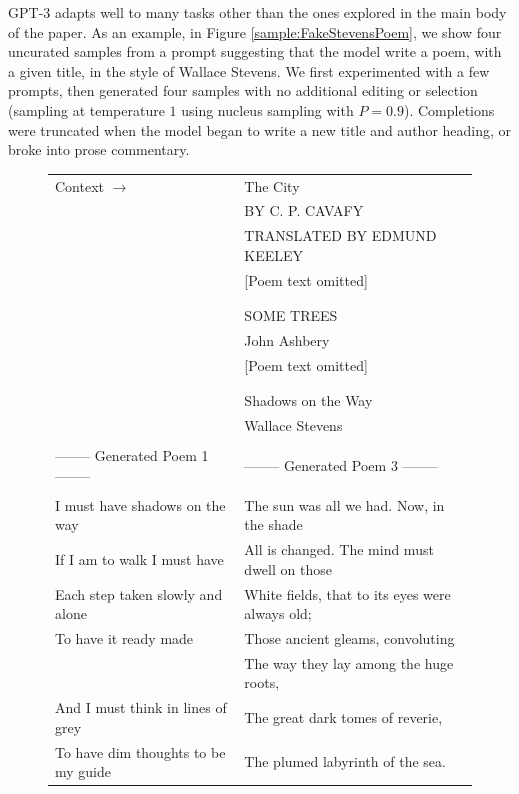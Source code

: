 GPT-3 adapts well to many tasks other than the ones explored in the main body of the paper.  As an example, in Figure \ref{sample:FakeStevensPoem}, we show four uncurated samples from a prompt suggesting that the model write a poem, with a given title, in the style of Wallace Stevens.  We first experimented with a few prompts, then generated four  samples with no additional editing or selection (sampling at temperature $1$ using nucleus sampling \cite{DBLP:journals/corr/abs-1904-09751} with $P=0.9$). Completions  were truncated when the model began to write a new title and author heading, or broke into prose commentary.


\begin{figure} { \tt \scriptsize \begin{center}\begin{tabular}{l l} \toprule Context $\to$ & The City \\
& BY C. P. CAVAFY  \\ 
& TRANSLATED BY EDMUND KEELEY \\
& [Poem text omitted] \\
 \\ \\
& SOME TREES \\
& John Ashbery \\
& [Poem text omitted] \\
 \\ \\ 
& Shadows on the Way \\
& Wallace Stevens \\
\midrule  
 & \\
 -------- Generated Poem 1  -------- &  -------- Generated Poem 3  -------- \\
 & \\
I must have shadows on the way & The sun was all we had. Now, in the shade\\
If I am to walk I must have & All is changed. The mind must dwell on those\\
Each step taken slowly and alone & White fields, that to its eyes were always old;\\
To have it ready made & Those ancient gleams, convoluting\\
 & The way they lay among the huge roots,\\
And I must think in lines of grey & The great dark tomes of reverie,\\
To have dim thoughts to be my guide & The plumed labyrinth of the sea.\\

\end{tabular}
\end{center}}
\end{figure}
